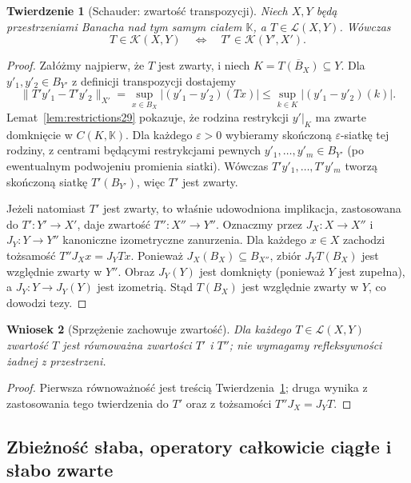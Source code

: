 \documentclass[11pt,a4paper]{article}
\numberwithin{equation}{section}
\theoremstyle{plain}
\newtheorem{twierdzenie}{Twierdzenie}[section]
\newtheorem{wniosek}[twierdzenie]{Wniosek}
\theoremstyle{definition}
\theoremstyle{remark}
\newcommand{\K}{\mathbb K}
\begin{document}
\begin{twierdzenie}[Schauder: zwartość transpozycji]
\label{thm:schauder-adjoint29}
Niech $X,Y$ będą przestrzeniami Banacha nad tym samym ciałem
$\K$, a $T\in\mathcal L(X,Y)$. Wówczas
\[
T\in\mathcal K(X,Y)\quad\Longleftrightarrow\quad
T'\in\mathcal K(Y',X').
\]
\end{twierdzenie}
\begin{proof}
Załóżmy najpierw, że $T$ jest zwarty, i niech
$K=\overline{T(B_X)}\subseteq Y$. Dla $y'_1,y'_2\in B_{Y'}$
z definicji transpozycji dostajemy
\[
\|T'y'_1-T'y'_2\|_{X'}
=\sup_{x\in B_X}|(y'_1-y'_2)(Tx)|
\le\sup_{k\in K}|(y'_1-y'_2)(k)|.
\]
Lemat~\ref{lem:restrictions29} pokazuje, że rodzina
restrykcji $y'|_K$ ma zwarte domknięcie w $C(K,\K)$.
Dla każdego $\varepsilon>0$ wybieramy skończoną
$\varepsilon$-siatkę tej rodziny, z centrami będącymi
restrykcjami pewnych $y'_1,\ldots,y'_m\in B_{Y'}$
(po ewentualnym podwojeniu promienia siatki).
Wówczas $T'y'_1,\ldots,T'y'_m$ tworzą skończoną
siatkę $T'(B_{Y'})$, więc $T'$ jest zwarty.

Jeżeli natomiast $T'$ jest zwarty, to właśnie udowodniona
implikacja, zastosowana do $T':Y'\to X'$, daje zwartość
$T'':X''\to Y''$. Oznaczmy przez $J_X:X\to X''$ i
$J_Y:Y\to Y''$ kanoniczne izometryczne zanurzenia.
Dla każdego $x\in X$ zachodzi tożsamość
$T''J_Xx=J_YTx$. Ponieważ $J_X(B_X)\subseteq B_{X''}$,
zbiór $J_YT(B_X)$ jest względnie zwarty w $Y''$.
Obraz $J_Y(Y)$ jest domknięty (ponieważ $Y$ jest zupełna),
a $J_Y:Y\to J_Y(Y)$ jest izometrią. Stąd $T(B_X)$
jest względnie zwarty w $Y$, co dowodzi tezy.
\end{proof}

\begin{wniosek}[Sprzężenie zachowuje zwartość]
\label{cor:schauder-iterated29}
Dla każdego $T\in\mathcal L(X,Y)$ zwartość $T$ jest
równoważna zwartości $T'$ i $T''$; nie wymagamy
refleksywności żadnej z przestrzeni.
\end{wniosek}
\begin{proof}
Pierwsza równoważność jest treścią
Twierdzenia~\ref{thm:schauder-adjoint29}; druga wynika
z zastosowania tego twierdzenia do $T'$ oraz z tożsamości
$T''J_X=J_YT$.
\end{proof}

\subsection{Zbieżność słaba, operatory całkowicie ciągłe i słabo zwarte}
\end{document}
